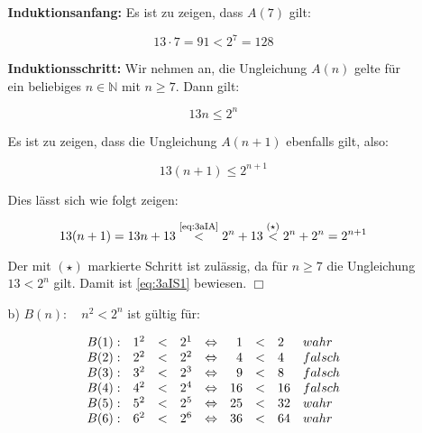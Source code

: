 \documentclass[a4paper,10pt]{scrartcl}
\begin{document}
\begin{enumerate}
\begin{enumerate}
                \textbf{Induktionsanfang:} Es ist zu zeigen, dass $A(7)$ gilt:

                $$13 \cdot 7 = 91 < 2^7 = 128$$

                \textbf{Induktionsschritt:} Wir nehmen an, die Ungleichung $A(n)$ gelte für ein beliebiges $n \in \mathbb{N}$ mit $n \geq 7$. Dann gilt:

                \begin{equation}\label{eq:3aIA}\tag{IA}
                    13n \leq 2^n
                \end{equation}

                Es ist zu zeigen, dass die Ungleichung $A(n + 1)$ ebenfalls gilt, also:

                \begin{equation}\label{eq:3aIS1}
                    13(n+1) \leq 2^{n+1}
                \end{equation}

                Dies lässt sich wie folgt zeigen:

                \begin{equation}
                    13(n+1) = 13n + 13 \overset{\text{\scriptsize\eqref{eq:3aIA}}}{<} 2^n + 13 \overset{(\star)}{<} 2^n + 2^n = 2^{n+1}
                \end{equation}

                Der mit $(\star)$ markierte Schritt ist zulässig, da für $n \geq 7$ die Ungleichung $13 < 2^n$ gilt. Damit
                ist \eqref{eq:3aIS1} bewiesen. $\Box$

            \item[b)]
                $B(n): \hspace{1em}n^2 < 2^n$ ist gültig für:

                $$\begin{array}{l rcl c rcl l}
                    B(1): & 1^2 &<& 2^1 &\Leftrightarrow&  1 &<&  2 & wahr\\
                    B(2): & 2^2 &<& 2^2 &\Leftrightarrow&  4 &<&  4 & falsch\\
                    B(3): & 3^2 &<& 2^3 &\Leftrightarrow&  9 &<&  8 & falsch\\
                    B(4): & 4^2 &<& 2^4 &\Leftrightarrow& 16 &<& 16 & falsch\\
                    B(5): & 5^2 &<& 2^5 &\Leftrightarrow& 25 &<& 32 & wahr\\
                    B(6): & 6^2 &<& 2^6 &\Leftrightarrow& 36 &<& 64 & wahr
                \end{array}$$


\end{enumerate}
\end{enumerate}
\end{document}
